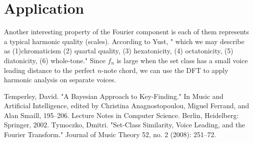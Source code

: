 \documentclass[12pt]{report}
\theoremstyle{definition}
\begin{document}
\section*{Application}
Another interesting property of the Fourier component is each of them 
represents a typical harmonic quality (scales). According to Yust, "
which we may describe as (1)chromaticism (2) quartal quality, 
(3) hexatonicity, (4) octatonicity, (5) diatonicity, (6) whole-tone."
Since $f_n$ is large when the set class has a small voice leading distance 
to the perfect $n$-note chord, we can use the DFT to apply harmonic analysis
on separate voices. 
\begin{thebibliography}{9}

Temperley, David. "A Bayesian Approach to Key-Finding." In Music and Artificial Intelligence, edited by Christina Anagnostopoulou, Miguel Ferrand, and Alan Smaill, 195–206. Lecture Notes in Computer Science. Berlin, Heidelberg: Springer, 2002.
Tymoczko, Dmitri. "Set-Class Similarity, Voice Leading, and the Fourier Transform." Journal of Music Theory 52, no. 2 (2008): 251–72.


\end{thebibliography}
\end{document}
